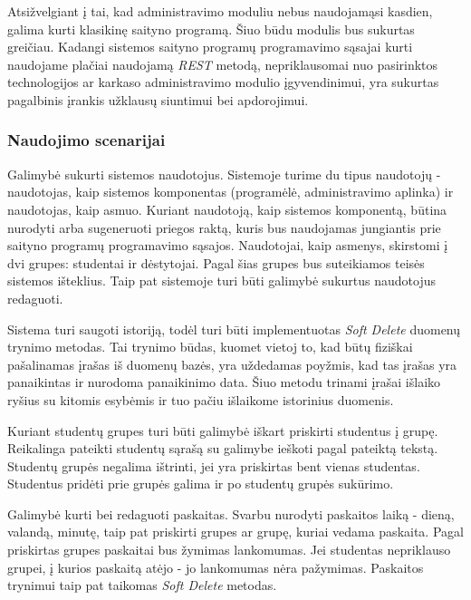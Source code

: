 \documentclass{VUMIFPSkursinis}
\begin{document}
Atsižvelgiant į tai, kad administravimo moduliu nebus naudojamąsi kasdien, galima kurti klasikinę saityno programą. Šiuo būdu modulis bus sukurtas greičiau. Kadangi sistemos saityno programų programavimo sąsajai kurti naudojame plačiai naudojamą \textit{REST} metodą, nepriklausomai nuo pasirinktos technologijos ar karkaso administravimo modulio įgyvendinimui, yra sukurtas pagalbinis įrankis užklausų siuntimui bei apdorojimui.

\subsubsection{Naudojimo scenarijai}


Galimybė sukurti sistemos naudotojus. Sistemoje turime du tipus naudotojų - naudotojas, kaip sistemos komponentas (programėlė, administravimo aplinka) ir naudotojas, kaip asmuo. Kuriant naudotoją, kaip sistemos komponentą, būtina nurodyti arba sugeneruoti priegos raktą, kuris bus naudojamas jungiantis prie saityno programų programavimo sąsajos. Naudotojai, kaip asmenys, skirstomi į dvi grupes: studentai ir dėstytojai. Pagal šias grupes bus suteikiamos teisės sistemos išteklius. Taip pat sistemoje turi būti galimybė sukurtus naudotojus redaguoti.

Sistema turi saugoti istoriją, todėl turi būti implementuotas \textit{Soft Delete} duomenų trynimo metodas. Tai trynimo būdas, kuomet vietoj to, kad būtų fiziškai pašalinamas įrašas iš duomenų bazės, yra uždedamas poyžmis, kad tas įrašas yra panaikintas ir nurodoma panaikinimo data. Šiuo metodu trinami įrašai išlaiko ryšius su kitomis esybėmis ir tuo pačiu išlaikome istorinius duomenis.


Kuriant studentų grupes turi būti galimybė iškart priskirti studentus į grupę. Reikalinga pateikti studentų sąrašą su galimybe ieškoti pagal pateiktą tekstą. Studentų grupės negalima ištrinti, jei yra priskirtas bent vienas studentas. Studentus pridėti prie grupės galima ir po studentų grupės sukūrimo.


Galimybė kurti bei redaguoti paskaitas. Svarbu nurodyti paskaitos laiką - dieną, valandą, minutę, taip pat priskirti grupes ar grupę, kuriai vedama paskaita. Pagal priskirtas grupes paskaitai bus žymimas lankomumas. Jei studentas nepriklauso grupei, į kurios paskaitą atėjo - jo lankomumas nėra pažymimas. Paskaitos trynimui taip pat taikomas \textit{Soft Delete} metodas.
\end{document}
